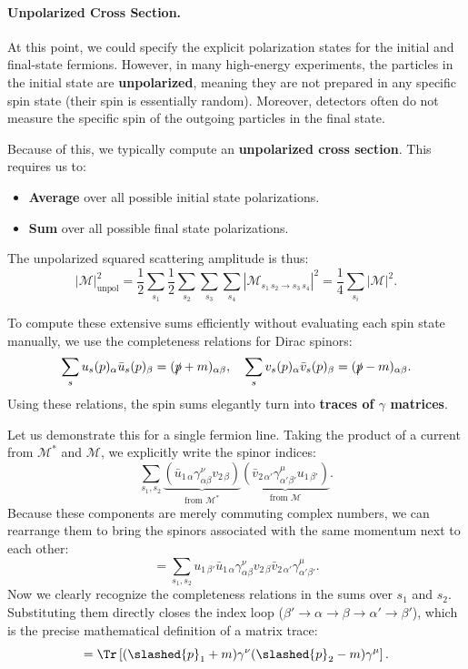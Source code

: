 \paragraph{Unpolarized Cross Section.}
At this point, we could specify the explicit polarization states for the initial and final-state fermions. However, in many high-energy experiments, the particles in the initial state are \textbf{unpolarized}, meaning they are not prepared in any specific spin state (their spin is essentially random). Moreover, detectors often do not measure the specific spin of the outgoing particles in the final state.

Because of this, we typically compute an \textbf{unpolarized cross section}. This requires us to:
\begin{itemize}
    \item \textbf{Average} over all possible initial state polarizations.
    \item \textbf{Sum} over all possible final state polarizations.
\end{itemize}
The unpolarized squared scattering amplitude is thus:
\[
    \vert \mathcal{M} \vert^2_{\text{unpol}} = \frac{1}{2} \sum_{s_1} \frac{1}{2} \sum_{s_2} \sum_{s_3} \sum_{s_4} \left| \mathcal{M}_{s_1\,s_2 \to s_3\,s_4} \right|^2 = \frac{1}{4} \sum_{s_i} |\mathcal{M}|^2.
\]

To compute these extensive sums efficiently without evaluating each spin state manually, we use the completeness relations for Dirac spinors:
\[
    \sum_s u_s(p)_\alpha \bar{u}_s(p)_\beta = (\slashed{p} + m)_{\alpha\beta}, \quad \sum_s v_s(p)_\alpha \bar{v}_s(p)_\beta = (\slashed{p} - m)_{\alpha\beta}.
\]
Using these relations, the spin sums elegantly turn into \textbf{traces of \(\gamma\) matrices}.

Let us demonstrate this for a single fermion line. Taking the product of a current from \(\mathcal{M}^*\) and \(\mathcal{M}\), we explicitly write the spinor indices:
\[
    \sum_{s_1, s_2} \underbrace{(\bar{u}_{1\,\alpha} \gamma^\nu_{\alpha\beta} v_{2\,\beta})}_{\text{from } \mathcal{M}^*} \underbrace{(\bar{v}_{2\,\alpha'} \gamma^\mu_{\alpha'\beta'} u_{1\,\beta'})}_{\text{from } \mathcal{M}}.
\]
Because these components are merely commuting complex numbers, we can rearrange them to bring the spinors associated with the same momentum next to each other:
\[
    = \sum_{s_1, s_2} u_{1\,\beta'} \bar{u}_{1\,\alpha} \gamma^\nu_{\alpha\beta} v_{2\,\beta} \bar{v}_{2\,\alpha'} \gamma^\mu_{\alpha'\beta'}.
\]
Now we clearly recognize the completeness relations in the sums over \(s_1\) and \(s_2\). Substituting them directly closes the index loop (\(\beta' \to \alpha \to \beta \to \alpha' \to \beta'\)), which is the precise mathematical definition of a matrix trace:
\[
    = \Tr \left[ (\slashed{p}_1 + m) \gamma^\nu (\slashed{p}_2 - m) \gamma^\mu \right].
\]

